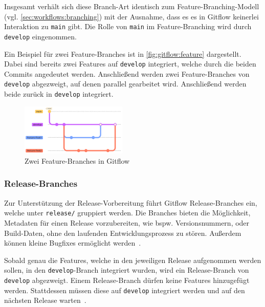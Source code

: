 Insgesamt verhält sich diese Branch\hyp Art identisch zum Feature\hyp Branching\hyp Modell (vgl. \autoref{sec:workflows:branching}) mit der Ausnahme, dass es es in Gitflow keinerlei Interaktion zu \texttt{main} gibt. Die Rolle von \texttt{main} im Feature\hyp Branching wird durch \texttt{develop} eingenommen.

Ein Beispiel für zwei Feature\hyp Branches ist in \autoref{fig:gitflow:feature} dargestellt. Dabei sind bereits zwei Features auf \texttt{develop} integriert, welche durch die beiden Commits angedeutet werden. Anschließend werden zwei Feature\hyp Branches von \texttt{develop} abgezweigt, auf denen parallel gearbeitet wird. Anschließend werden beide zurück in \texttt{develop} integriert.

\begin{figure}
    \includegraphics[width=0.45\textwidth]{src/assets/diagrams/gitflow/feature.pdf}
    \caption{Zwei Feature-Branches in Gitflow}
    \label{fig:gitflow:feature}
\end{figure}


\subsubsection{Release-Branches}

Zur Unterstützung der Release\hyp Vorbereitung führt Gitflow Release\hyp Branches ein, welche unter \texttt{release/} gruppiert werden. Die Branches bieten die Möglichkeit, Metadaten für einen Release vorzubereiten, wie bspw. Versionsnummern, oder Build-Daten, ohne den laufenden Entwicklungsprozess zu stören. Außerdem können kleine Bugfixes ermöglicht werden~\cite{driessenSuccessfulGitBranching2010}.

Sobald genau die Features, welche in den jeweiligen Release aufgenommen werden sollen, in den \texttt{develop}-Branch integriert wurden, wird ein Release\hyp Branch von \texttt{develop} abgezweigt. Einem Release\hyp Branch dürfen keine Features hinzugefügt werden. Stattdessen müssen diese auf \texttt{develop} integriert werden und auf den nächsten Release warten~\cite{driessenSuccessfulGitBranching2010}.

